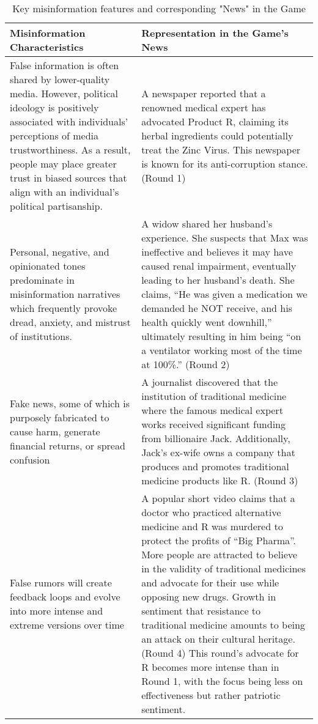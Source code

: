 \begin{table*}[htbp]
\renewcommand\arraystretch{2}
\centering
\caption{Key misinformation features and corresponding "News" in the Game}
\begin{tabular*}{\textwidth}{@{}p{5cm} p{10cm}@{}}
\toprule
\textbf{Misinformation Characteristics} & \textbf{Representation in the Game's News} \\ 
\midrule
False information is often shared by lower-quality media. However, political ideology is positively associated with individuals' perceptions of media trustworthiness. As a result, people may place greater trust in biased sources that align with an individual's political partisanship.\cite{zhang2020overview,molina2021fake,hanley2023golden}
%  
& 
A newspaper reported that a renowned medical expert has advocated Product R, claiming its herbal ingredients could potentially treat the Zinc Virus. This newspaper is known for its anti-corruption stance. (Round 1) \\ \hline
Personal, negative, and opinionated tones predominate in misinformation narratives which frequently provoke dread, anxiety, and mistrust of institutions\cite{bessi2015trend,porat2019content}.  & 
A widow shared her husband's experience. She suspects that Max was ineffective and believes it may have caused renal impairment, eventually leading to her husband’s death. She claims, “He was given a medication we demanded he NOT receive, and his health quickly went downhill,” ultimately resulting in him being “on a ventilator working most of the time at 100\%.” (Round 2) \\ \hline
Fake news, some of which is purposely fabricated to cause harm, generate financial returns, or spread confusion\cite{mustafaraj2017fake,hanley2023golden,shu2017fake} & 
A journalist discovered that the institution of traditional medicine where the famous medical expert works received significant funding from billionaire Jack. Additionally, Jack's ex-wife owns a company that produces and promotes traditional medicine products like R. (Round 3) \\ \hline
False rumors will create feedback loops and evolve into more intense and extreme versions over time\cite{shin2018diffusion} & A popular short video claims that a doctor who practiced alternative medicine and R was murdered to protect the profits of “Big Pharma”. More people are attracted to believe in the validity of traditional medicines and advocate for their use while opposing new drugs. Growth in sentiment that resistance to traditional medicine amounts to being an attack on their cultural heritage. (Round 4) This round's advocate for R becomes more intense than in Round 1, with the focus being less on effectiveness but rather patriotic sentiment.\\ 
\bottomrule
\end{tabular*}
\end{table*}

